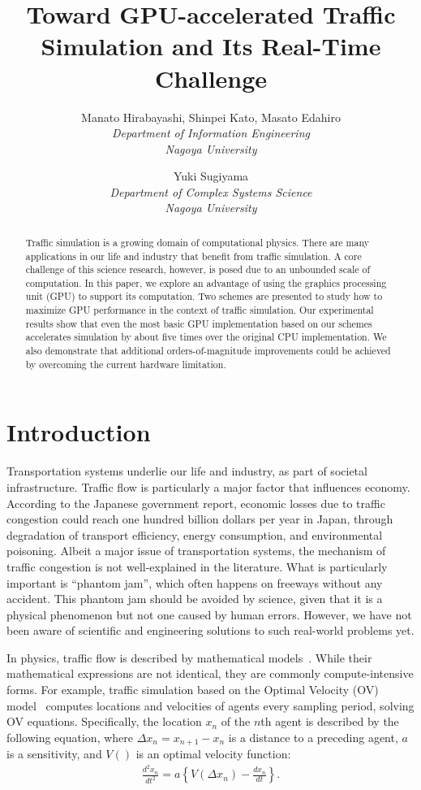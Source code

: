 \documentclass[times, 10pt, twocolumn]{article}
\title{Toward GPU-accelerated Traffic Simulation and Its Real-Time Challenge}
\author {
Manato Hirabayashi, Shinpei Kato, Masato Edahiro\\
\textit{Department of Information Engineering}\\
\textit{Nagoya University}\\
\and
Yuki Sugiyama\\
\textit{Department of Complex Systems Science}\\
\textit{Nagoya University}\\
}
\begin{document}
\maketitle


\begin{abstract}
 Traffic simulation is a growing domain of computational physics.
 There are many applications in our life and industry that benefit
 from traffic simulation.
 A core challenge of this science research, however, is posed due to
 an unbounded scale of computation.
 In this paper, we explore an advantage of using the graphics processing
 unit (GPU) to support its computation.
 Two schemes are presented to study how to maximize GPU
 performance in the context of traffic simulation.
 Our experimental results show that even the most basic GPU
 implementation based on our schemes accelerates simulation by about
 five times over the original CPU implementation.
 We also demonstrate that additional orders-of-magnitude
 improvements could be achieved by overcoming the current hardware
 limitation.
\end{abstract}

\section{Introduction}

Transportation systems underlie our life and industry, as part of
societal infrastructure.
Traffic flow is particularly a major factor that influences economy.
According to the Japanese government report, economic losses due to
traffic congestion could reach one hundred billion dollars per year in
Japan, through degradation of transport efficiency, energy consumption,
and environmental poisoning.
Albeit a major issue of transportation systems, the mechanism of traffic
congestion is not well-explained in the literature.
What is particularly important is ``phantom jam'', which often happens
on freeways without any accident.
This phantom jam should be avoided by science, given that it is
a physical phenomenon but not one caused by human errors.
However, we have not been aware of scientific and engineering solutions
to such real-world problems yet.

In physics, traffic flow is described by mathematical
models~\cite{Bando1995, Bando1995_2, Kerner1993, Nagel1992}.
While their mathematical expressions are not identical, they are
commonly compute-intensive forms.
For example, traffic simulation based on the Optimal Velocity (OV)
model~\cite{Bando1995, Bando1995_2} computes locations and velocities of
agents every sampling period, solving OV equations. 
Specifically, the location $x_n$ of the $n$th agent is described by the
following equation, where $\Delta x_n = x_{n+1} - x_n$ is a distance to
a preceding agent, $a$ is a sensitivity, and $V()$ is an optimal
velocity function:
\begin{eqnarray}
 \label{eqn:ov}
 \frac{d^2 x_n}{d t^2} = a \left\{V(\Delta x_n) - \frac{d x_n}{d t}\right\}.
\end{eqnarray}
\end{document}
